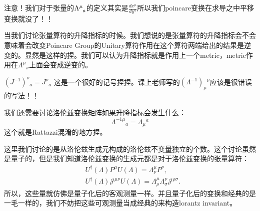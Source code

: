 
注意！我们对于张量的$ \tensor{\Lambda}{^\mu_a} $的定义其实是$ \displaystyle\frac{dx^\mu}{dy^a} $所以我们poincare变换在求导之中平移变换就没了！！


当我们讨论张量算符的升降指标的时候。我们想说的是张量算符的升降指标会不会意味着会改变Poincare Group的Unitary算符作用在这个算符两端给出的结果是逆变的。显然是这样的捏。我们可以认为升降指标就是作用上一个metric，metric作用在$ \Lambda^\mu{}_\nu $上面会变成逆变的。 


$ (J^{-1})^{\nu}{}_{a} = J^\nu{}_a$ 这是一个很好的记号捏捏。课上老师写的$ (\Lambda^{-1})_\mu{}^{\nu} $应该是很错误的写法！！

我们还需要讨论洛伦兹变换矩阵如果升降指标会发生什么：
\begin{equation}
  \Lambda^{-1\mu}{}_a = \Lambda_\mu{}^a
  \label{eq:inverseandlift}
\end{equation}
这个就是Rattazzi混淆的地方捏。





这里我们讨论的是从洛伦兹生成元构成的洛伦兹不变量独立的个数。这个讨论虽然是量子的，但是我们知道洛伦兹变换的生成元都是对于洛伦兹变换的张量算符：
\begin{equation}
  \begin{aligned}&U^\dagger(\Lambda)P^\mu U(\Lambda)=\Lambda_\nu^\mu P^\nu,\\&U^\dagger(\Lambda)\mathcal{J}^{\mu\nu}U(\Lambda)=\Lambda_\rho^\mu\Lambda_\sigma^\nu\mathcal{J}^{\rho\sigma}.\end{aligned}
  \label{eq:tensoroperator}
\end{equation}
所以，这些量就仿佛是量子化后的客观测量一样。并且量子化后的变换和经典的是一毛一样的，我们不妨把这些可观测量当成经典的来构造lorantz invariant。

